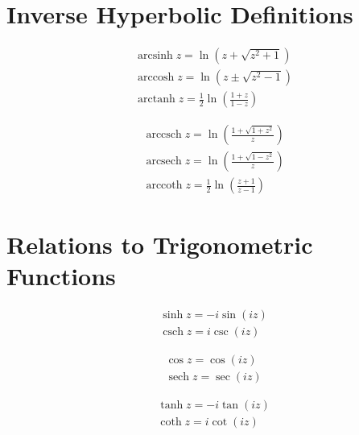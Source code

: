 \documentclass[11pt]{article}
\begin{document}
\section{Inverse Hyperbolic Definitions}

\begin{align*}
& \operatorname{arcsinh}z=\ln\left(z+\sqrt{z^2+1}\right) \\
& \operatorname{arccosh}z=\ln\left(z\pm\sqrt{z^2-1}\right) \\
& \operatorname{arctanh}z=\frac{1}{2}\ln\left(\frac{1+z}{1-z}\right)
\end{align*}

\begin{align*}
& \operatorname{arccsch}z=\ln\left(\frac{1+\sqrt{1+z^2}}{z}\right) \\
& \operatorname{arcsech}z=\ln\left(\frac{1+\sqrt{1-z^2}}{z}\right) \\
& \operatorname{arccoth}z=\frac{1}{2}\ln\left(\frac{z+1}{z-1}\right)
\end{align*}


\section{Relations to Trigonometric Functions}

\begin{align*}
& \sinh z=-i\sin\left(iz\right) \\
& \operatorname{csch}z=i\csc\left(iz\right)
\end{align*}

\begin{align*}
& \cos z=\cos\left(iz\right) \\
& \operatorname{sech}z=\sec\left(iz\right)
\end{align*}

\begin{align*}
& \tanh z=-i\tan\left(iz\right) \\
& \coth z=i\cot\left(iz\right)
\end{align*}
\end{document}
